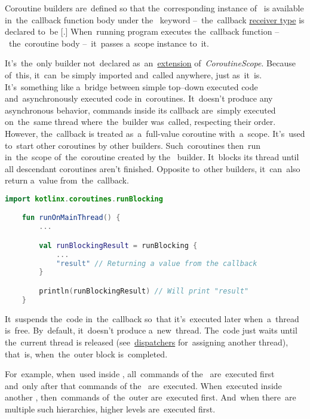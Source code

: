 Coroutine builders are~defined so that the~corresponding instance of~ is available in~the~callback function body under the~ keyword --~the~callback \hyperref[kotlinanonymousreceivertype]{receiver type} is declared to~be [.]
When~running program executes the~callback function --~the~coroutine body --~it~passes a~scope instance to~it.

\label{kotlincoroutinerunblocking}
It's~the~only builder not~declared as~an~\hyperref[kotlinextension]{extension} of~\textit{CoroutineScope}.
Because of~this, it~can~be simply imported and~called anywhere, just as~it~is.
It's~something like a~bridge between simple top--down executed code and~asynchronously executed code in~coroutines.
It~doesn't produce any asynchronous behavior, commands inside its callback are~simply executed on~the~same thread where~the~builder was~called, respecting their order.
However, the~callback is treated as~a~full-value coroutine with~a~scope.
It's~used to~start other coroutines by other builders.
Such~coroutines then~run in~the~scope of~the~coroutine created by the~ builder.
It~blocks its thread until all descendant coroutines aren't finished.
Opposite to~other builders, it~can~also return a~value from~the~callback.

\begin{lstlisting}[language=Kotlin]
    import kotlinx.coroutines.runBlocking

    fun runOnMainThread() {
        ...

        val runBlockingResult = runBlocking {
            ...
            "result" // Returning a value from the callback
        }

        println(runBlockingResult) // Will print "result"
    }
\end{lstlisting}

\label{kotlincoroutinelaunch}
It~suspends the~code in~the~callback so~that it's~executed later when~a~thread is~free.
By~default, it~doesn't produce a~new~thread.
The~code just waits until the~current thread is released (see~\hyperref[kotlincoroutinedispatcher]{dispatchers} for~assigning another thread), that~is, when~the~outer block is~completed.

For~example, when~used inside , all~commands of the~ are~executed first and~only after that commands of the~ are~executed.
When~executed inside another , then~commands of~the~outer  are~executed first.
And~when there~are multiple such  hierarchies, higher levels are~executed first.

